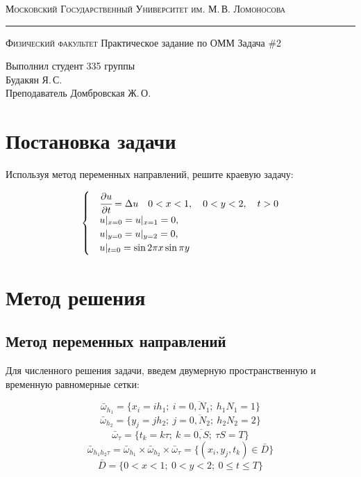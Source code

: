 \documentclass[12pt]{article}
\author{Будакян Я. С.}
\def\dd#1#2{\cfrac{\partial#1}{\partial#2}}
\begin{document}
	\begin{titlepage}
		\begin{center}
			{\small\textsc{Московский Государственный Университет им. М.\,В. Ломоносова}}
			\vskip 1pt \hrule \vskip 3pt
			{\small\textsc{Физический факультет}}
			\vfill
			{\Large Практическое задание по ОММ}
			\break
			\break
			{\Large Задача \#2}	
		\end{center}
		
		\vfill
		
		\begin{flushright}
			{Выполнил студент 335 группы\\Будакян Я.\,С.\\
			 Преподаватель Домбровская Ж.\,О.}
		\end{flushright}
	\end{titlepage}
	
	\section{Постановка задачи}
		\bigskip\par{}
		Используя метод переменных направлений, решите краевую задачу:
		
		\begin{equation}
			\begin{cases}
				&\dd{u}t = \Delta u \quad 0 < x < 1, \quad 0 < y < 2, \quad t > 0 \\
				&u\vert_{x=0} = u\vert_{x=1} = 0,\\
				&u\vert_{y=0} = u\vert_{y=2} = 0,\\
				&u\vert_{t=0} = \sin 2\pi x \sin \pi y
			\end{cases}
		\end{equation}
	
	\section{Метод решения}
		\subsection{Метод переменных направлений}
			Для численного решения задачи, введем двумерную пространственную и временную равномерные сетки:
			
			$$\bar{\omega}_{h_1} = \{x_i = ih_1;\ i = \overline{0,N_1};\ h_1 N_1 = 1\}$$
			$$\bar{\omega}_{h_2} = \{y_j = jh_2;\ j = \overline{0,N_2};\ h_2 N_2 = 2\}$$
			$$\bar{\omega}_\tau = \{t_k = k\tau;\ k =\overline{0,S};\ \tau S = T\}$$
			$$\bar{\omega}_{h_1 h_2 \tau} = \bar{\omega}_{h_1} \times \bar{\omega}_{h_2} \times \bar{\omega}_\tau = 
			\{ (x_i, y_j, t_k) \in \bar{D} \}$$
			$$\bar{D} = \{ 0 < x < 1;\ 0 < y < 2;\ 0 \le t \le T \}$$
			
\end{document}
